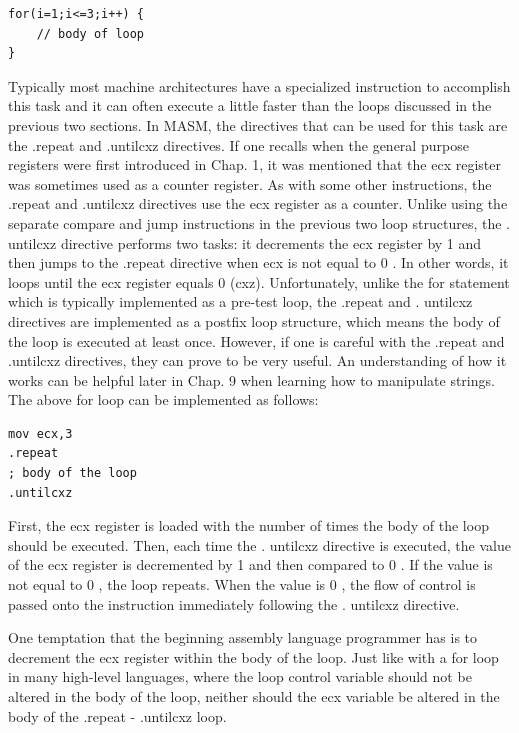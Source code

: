 \documentclass[10pt]{book}
\begin{document}
\begin{verbatim}
for(i=1;i<=3;i++) {
    // body of loop
}
\end{verbatim}

Typically most machine architectures have a specialized instruction to accomplish this task and it can often execute a little faster than the loops discussed in the previous two sections. In MASM, the directives that can be used for this task are the .repeat and .untilcxz directives. If one recalls when the general purpose registers were first introduced in Chap. 1, it was mentioned that the ecx register was sometimes used as a counter register. As with some other instructions, the .repeat and .untilcxz directives use the ecx register as a counter. Unlike using the separate compare and jump instructions in the previous two loop structures, the . untilcxz directive performs two tasks: it decrements the ecx register by 1 and then jumps to the .repeat directive when ecx is not equal to 0 . In other words, it loops until the ecx register equals 0 (cxz). Unfortunately, unlike the for statement which is typically implemented as a pre-test loop, the .repeat and . untilcxz directives are implemented as a postfix loop structure, which means the body of the loop is executed at least once. However, if one is careful with the .repeat and .untilcxz directives, they can prove to be very useful. An understanding of how it works can be helpful later in Chap. 9 when learning how to manipulate strings. The above for loop can be implemented as follows:

\begin{verbatim}
mov ecx,3
.repeat
; body of the loop
.untilcxz
\end{verbatim}

First, the ecx register is loaded with the number of times the body of the loop should be executed. Then, each time the . untilcxz directive is executed, the value of the ecx register is decremented by 1 and then compared to 0 . If the value is not equal to 0 , the loop repeats. When the value is 0 , the flow of control is passed onto the instruction immediately following the . untilcxz directive.


One temptation that the beginning assembly language programmer has is to decrement the ecx register within the body of the loop. Just like with a for loop in many high-level languages, where the loop control variable should not be altered in the body of the loop, neither should the ecx variable be altered in the body of the .repeat - .untilcxz loop.
\end{document}
